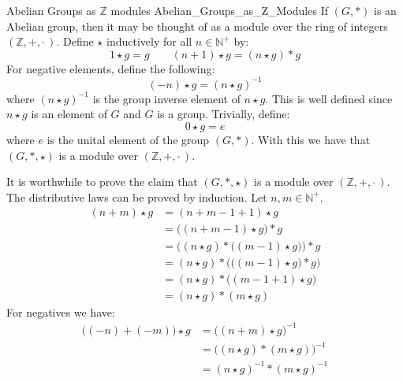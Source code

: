     \begin{fexample}{Abelian Groups as $\mathbb{Z}$ modules}
                    {Abelian_Groups_as_Z_Modules}
        If $(G,*)$ is an Abelian group, then it may be thought of as a module
        over the ring of integers $(\mathbb{Z},+,\cdot\,)$. Define $\star$
        inductively for all $n\in\mathbb{N}^{+}$ by:
        \begin{equation}
            1\star{g}=g
            \quad\quad
            (n+1)\star{g}=(n\star{g})*g
        \end{equation}
        For negative elements, define the following:
        \begin{equation}
            (\minus{n})\star{g}=(n\star{g})^{\minus{1}}
        \end{equation}
        where $(n\star{g})^{\minus{1}}$ is the group inverse element of
        $n\star{g}$. This is well defined since $n\star{g}$ is an element of $G$
        and $G$ is a group. Trivially, define:
        \begin{equation}
            0\star{g}=e
        \end{equation}
        where $e$ is the unital element of the group $(G,*)$. With this we have
        that $(G,*,\star)$ is a module over $(\mathbb{Z},+,\cdot\,)$.
    \end{fexample}
    It is worthwhile to prove the claim that $(G,*,\star)$ is a module over
    $(\mathbb{Z},+,\cdot\,)$. The distributive laws can be proved by induction.
    Let $n,m\in\mathbb{N}^{+}$.
    \begin{subequations}
        \begin{align}
            (n+m)\star{g}
            &=(n+m-1+1)\star{g}\\
            &=\big((n+m-1)\star{g}\big)*g\\
            &=\Big((n\star{g})*\big((m-1)\star{g}\big)\Big)*g\\
            &=(n\star{g})*\Big(\big((m-1)\star{g})*g\Big)\\
            &=(n\star{g})*\big((m-1+1)\star{g}\big)\\
            &=(n\star{g})*(m\star{g})
        \end{align}
    \end{subequations}
    For negatives we have:
    \begin{subequations}
        \begin{align}
            \big((\minus{n})+(\minus{m})\big)\star{g}
                &=\big((n+m)\star{g}\big)^{\minus{1}}\\
                &=\big((n\star{g})*(m\star{g})\big)^{\minus{1}}\\
                &=(n\star{g})^{\minus{1}}*(m\star{g})^{\minus{1}}
        \end{align}
    \end{subequations}
